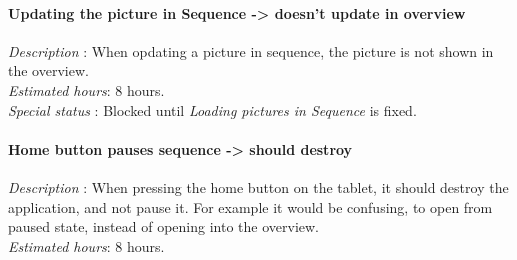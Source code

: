 \paragraph{Updating the picture in Sequence -> doesn't update in overview}
\emph{Description} : When opdating a picture in sequence, the picture is not shown in the overview. \\
\emph{Estimated hours}: 8 hours.\\
\emph{Special status} : Blocked until \emph{Loading pictures in Sequence} is fixed.
\paragraph{Home button pauses sequence -> should destroy}
\emph{Description} : When pressing the home button on the tablet, it should destroy the application, and not pause it. For example it would be confusing, to open from paused state, instead of opening into the overview. \\
\emph{Estimated hours}: 8 hours.